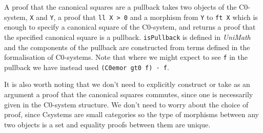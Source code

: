 A proof that the canonical squares are a pullback takes two objects of the
C0-system, \verb|X| and \verb|Y|, a proof that \verb|ll X > 0| and a morphism
from \verb|Y| to \verb|ft X| which is enough to specify a canonical square of
the C0-system, and returns a proof that the specified canonical square is a
pullback. \verb|isPullback| is defined in \textit{UniMath} and the components of
the pullback are constructed from terms defined in the formalisation of
C0-systems. Note that where we might expect to see \verb|f| in the pullback we
have instead used \verb|(C0emor gt0 f) · f|.

It is also worth noting that we don't need to explicitly construct or take as an
argument a proof that the canonical squares commutes, since one is necessarily
given in the C0-system structure. We don't need to worry about the choice of
proof, since Csystems are small categories so the type of morphisms between any
two objects is a set and equality proofs between them are unique.